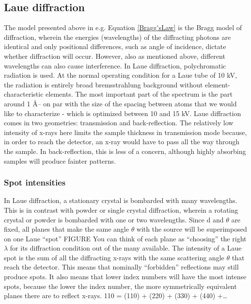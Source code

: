 \subsection{Laue diffraction}
The model presented above in e.g. Equation \ref{Bragg'sLaw} is the Bragg model of diffraction, wherein the energies (wavelengths) of the diffracting photons are identical and only positional differences, such as angle of incidence, dictate whether diffraction will occur. However, also as mentioned above, different wavelengths can also cause interference. In Laue diffraction, polychromatic radiation is used. At the normal operating condition for a Laue tube of 10 kV, the radiation is entirely broad bremsstrahlung background without element-characteristic elements. The most important part of the spectrum is the part around 1 \AA – on par with the size of the spacing between atoms that we would like to characterize - which is optimized between 10 and 15 kV. Laue diffraction comes in two geometries: transmission and back-reflection. The relatively low intensity of x-rays here limits the sample thickness in transmission mode because, in order to reach the detector, an x-ray would have to pass all the way through the sample. In back-reflection, this is less of a concern, although highly absorbing samples will produce fainter patterns.

\subsubsection{Spot intensities}
In Laue diffraction, a stationary crystal is bombarded with many wavelengths. This is in contrast with powder or single crystal diffraction, wherein a rotating crystal or powder is bombarded with one or two wavelengths. Since d and $\theta$ are fixed, all planes that make the same angle $\theta$ with the source will be superimposed on one Laue “spot” FIGURE
You can think of each plane as “choosing” the right $\lambda$ for its diffraction condition out of the many available. The intensity of a Laue spot is the sum of all the diffracting x-rays with the same scattering angle $\theta$ that reach the detector.
This means that nominally “forbidden” reflections may still produce spots.
It also means that lower index numbers will have the most intense spots, because the lower the index number, the more symmetrically equivalent planes there are to reflect x-rays.
{110} = (110) + (220) + (330) + (440) +…

